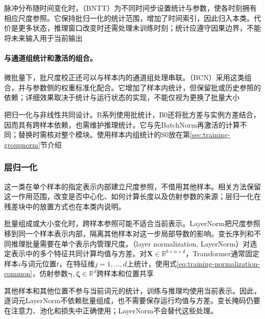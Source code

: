 脉冲分布随时间变化时，（BNTT）为不同时间步设置统计与参数，使各时刻拥有相应尺度参照。它保持批归一化的统计范围，增加了时间索引，因此归入本类。代价是更多状态，推理窗口改变时还需处理未训练时刻；统计应遵守因果边界，不能将未来输入用于当前输出

\paragraph{与通道组统计和激活的组合。}

微批量下，批尺度校正还可以与样本内的通道组处理串联。（BCN）采用这类组合，并与参数侧的权重标准化配合。它增加了样本内统计，但保留批或历史参照的依赖；详细效果取决于统计与运行状态的实现，不能仅视为更换了批量大小

把归一化与非线性共同设计。B系列使用批统计，B0还将批方差与实例方差结合，因而具有跨样本依赖，也需维护推理统计。它与先BatchNorm再激活的计算不同；替换时需核对整个模块。使用样本内组统计的S0放在第\ref{sec:training-groupnorm}节介绍

\subsubsection{层归一化}
\label{sec:training-layernorm-family}
\label{sec:training-layernorm}
\label{sec:training-rmsnorm}
\label{sec:training-scalenorm}
\label{sec:training-pixelnorm}
\label{sec:training-qknorm}
\label{sec:training-adaptive-layernorm}
\label{sec:training-normalization-block-designs}
\label{sec:training-normalization-placement}
\label{sec:training-other-normalization-designs}
这一类在单个样本的指定表示内部建立尺度参照，不借用其他样本。相关方法保留这一作用范围，改变是否中心化、如何计算长度以及仿射参数的来源；层归一化在残差块中的放置方式也在本类内说明。

批量组成或大小变化时，跨样本参照可能不适合当前表示。LayerNorm把尺度参照移到同一个样本表示内部，隔离其他样本对这一步局部导数的影响。变长序列和不同推理批量需要在单个表示内管理尺度。（layer normalization, LayerNorm）对选定表示中的多个特征共同计算均值与方差。对$\bm X\in\mathbb R^{b\times n\times d}$，Transformer通常固定样本$i$与词元位置$t$，在特征维$j=1,\ldots,d$上统计，使用式\eqref{eq:training-normalization-common}，仿射参数$\bm\gamma,\bm\zeta\in\mathbb R^d$跨样本和位置共享

其他样本和其他位置不参与当前词元的统计，训练与推理均使用当前表示。因此，逐词元LayerNorm不依赖批量组成，也不需要保存运行均值与方差。变长掩码仍要在注意力、池化和损失中正确使用；LayerNorm不会替代这些处理。

